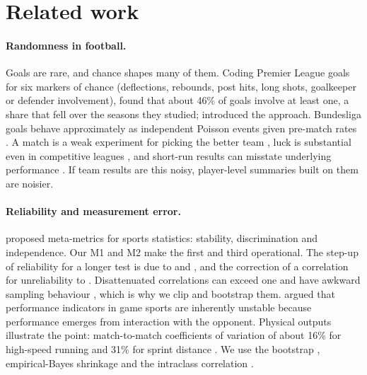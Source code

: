 \documentclass[11pt,a4paper]{article}
\begin{document}
\section{Related work}
\label{sec:related}

\paragraph{Randomness in football.}
Goals are rare, and chance shapes many of them. Coding Premier League goals
for six markers of chance (deflections, rebounds, post hits, long shots,
goalkeeper or defender involvement), \citet{wunderlich2021randomness} found
that about 46\% of goals involve at least one, a share that fell over the
seasons they studied; \citet{lames2018chance} introduced the approach.
Bundesliga goals behave approximately as independent Poisson events given
pre-match rates \citep{heuer2010poisson}. A match is a weak experiment for
picking the better team \citep{skinner2009experiments}, luck is substantial
even in competitive leagues \citep{aoki2017luck}, and short-run results can
misstate underlying performance \citep{brechot2020randomness}. If team results
are this noisy, player-level summaries built on them are noisier.

\paragraph{Reliability and measurement error.}
\citet{franks2016metaanalytics} proposed meta-metrics for sports statistics:
stability, discrimination and independence. Our M1 and M2 make the first and
third operational. The step-up of reliability for a longer test is due to
\citet{spearman1910faulty} and \citet{brown1910experimental}, and the
correction of a correlation for unreliability to \citet{spearman1904proof}.
Disattenuated correlations can exceed one and have awkward sampling
behaviour \citep{charles2005attenuation}, which is why we clip and bootstrap
them. \citet{lames2007reliable} argued that performance indicators in game
sports are inherently unstable because performance emerges from interaction
with the opponent. Physical outputs illustrate the point: match-to-match
coefficients of variation of about 16\% for high-speed running and 31\% for
sprint distance \citep{gregson2010variability}. We use the bootstrap
\citep{efron1979bootstrap}, empirical-Bayes shrinkage \citep{efron1975stein}
and the intraclass correlation \citep{shrout1979icc}.
\end{document}
